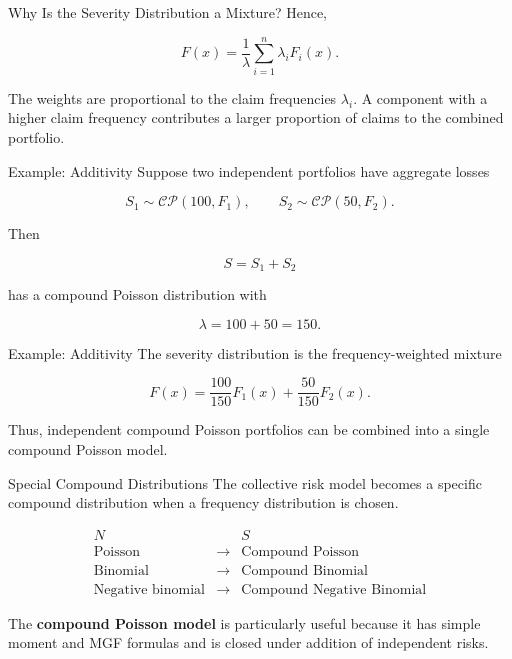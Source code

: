 \documentclass[
  ignorenonframetext,
  aspectratio=169,
]{beamer}
\begin{document}
\begin{frame}{Why Is the Severity Distribution a Mixture?}
\protect{}\label{why-is-the-severity-distribution-a-mixture-1}
Hence,

\[
\boxed{
F(x)
=
\frac{1}{\lambda}
\sum_{i=1}^{n}\lambda_iF_i(x).
}
\]

The weights are proportional to the claim frequencies \(\lambda_i\). A
component with a higher claim frequency contributes a larger proportion
of claims to the combined portfolio.
\end{frame}

\begin{frame}{Example: Additivity}
\protect{}\label{example-additivity}
Suppose two independent portfolios have aggregate losses

\[
S_1\sim\mathcal{CP}(100,F_1),
\qquad
S_2\sim\mathcal{CP}(50,F_2).
\]

Then

\[
S=S_1+S_2
\]

has a compound Poisson distribution with

\[
\boxed{\lambda=100+50=150}.
\]
\end{frame}

\begin{frame}{Example: Additivity}
\protect{}\label{example-additivity-1}
The severity distribution is the frequency-weighted mixture

\[
\boxed{
F(x)
=
\frac{100}{150}F_1(x)
+
\frac{50}{150}F_2(x)
}.
\]

Thus, independent compound Poisson portfolios can be combined into a
single compound Poisson model.
\end{frame}

\begin{frame}{Special Compound Distributions}
\protect{}\label{special-compound-distributions-1}
The collective risk model becomes a specific compound distribution when
a frequency distribution is chosen.

\[
\boxed{
\begin{array}{ccc}
N & & S\\[2pt]
\text{Poisson}
&\longrightarrow&
\text{Compound Poisson}\\
\text{Binomial}
&\longrightarrow&
\text{Compound Binomial}\\
\text{Negative binomial}
&\longrightarrow&
\text{Compound Negative Binomial}
\end{array}
}
\]

The \textbf{compound Poisson model} is particularly useful because it
has simple moment and MGF formulas and is closed under addition of
independent risks.
\end{frame}
\end{document}
